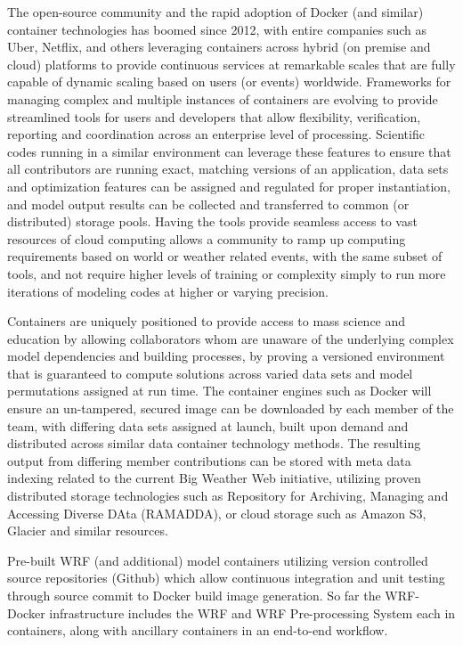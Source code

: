 \documentclass[draft]{ametsoc}
\begin{document}
The open-source community and the rapid adoption of Docker (and similar) container technologies has boomed since 2012, with entire companies such as Uber, Netflix, and others leveraging containers across hybrid (on premise and cloud) platforms to provide continuous services at remarkable scales that are fully capable of dynamic scaling based on users (or events) worldwide.  Frameworks for managing complex and multiple instances of containers are evolving to provide streamlined tools for users and developers that allow flexibility, verification, reporting and coordination across an enterprise level of processing.  Scientific codes running in a similar environment can leverage these features to ensure that all contributors are running exact, matching versions of an application, data sets and optimization features can be assigned and regulated for proper instantiation, and model output results can be collected and transferred to common (or distributed) storage pools.  Having the tools provide seamless access to vast resources of cloud computing allows a community to ramp up computing requirements based on world or weather related events, with the same subset of tools, and not require higher levels of training or complexity simply to run more iterations of modeling codes at higher or varying precision.

Containers are uniquely positioned to provide access to mass science and education by allowing collaborators whom are unaware of the underlying complex model dependencies and building processes, by proving a versioned environment that is guaranteed to compute solutions across varied data sets and model permutations assigned at run time.  The container engines such as Docker will ensure an un-tampered, secured image can be downloaded by each member of the team, with differing data sets assigned at launch, built upon demand and distributed across similar data container technology methods.  The resulting output from differing member contributions can be stored with meta data indexing related to the current Big Weather Web initiative, utilizing proven distributed storage technologies such as Repository for Archiving, Managing and Accessing Diverse DAta (RAMADDA), or cloud storage such as Amazon S3, Glacier and similar resources. 

Pre-built WRF (and additional) model containers utilizing version controlled source repositories (Github) which allow continuous integration and unit testing through source commit to Docker build image generation. So far the WRF-Docker infrastructure includes the WRF and WRF Pre-processing System each in containers, along with ancillary containers in an end-to-end workflow.  
\end{document}
